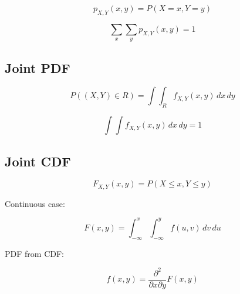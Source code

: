 \documentclass[12pt]{article}
\begin{document}
\[
p_{X,Y}(x,y)=P(X=x,Y=y)
\]

\[
\sum_x\sum_y p_{X,Y}(x,y)=1
\]

\subsection{Joint PDF}

\[
P((X,Y)\in R)=\int\int_R f_{X,Y}(x,y)\,dx\,dy
\]

\[
\int\int f_{X,Y}(x,y)\,dx\,dy=1
\]

\subsection{Joint CDF}

\[
F_{X,Y}(x,y)=P(X\le x,Y\le y)
\]

Continuous case:

\[
F(x,y)=\int_{-\infty}^{x}\int_{-\infty}^{y}f(u,v)\,dv\,du
\]

PDF from CDF:

\[
f(x,y)=\frac{\partial^2}{\partial x \partial y}F(x,y)
\]
\end{document}
